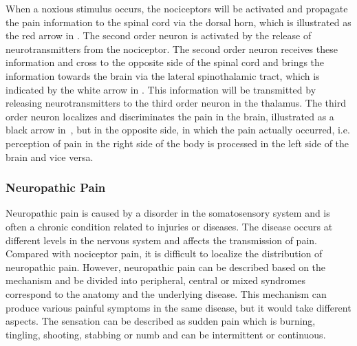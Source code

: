 When a noxious stimulus occurs, the nociceptors will be activated and propagate the pain information to the spinal cord via the dorsal horn, which is illustrated as the red arrow in . The second order neuron is activated by the release of neurotransmitters from the nociceptor. The second order neuron receives these information and cross  to the opposite side of the spinal cord and brings the information towards the brain via the lateral spinothalamic tract, which is indicated by the white arrow in . This information will be transmitted by releasing neurotransmitters to the third order neuron in the thalamus. The third order neuron localizes and discriminates the pain in the brain, illustrated as a black arrow in~, but in the opposite side, in which the pain actually occurred, i.e. perception of pain in the right side of the body is processed in the left side of the brain and vice versa. \cite{Martini2012} 

  



\subsubsection{Neuropathic Pain}
Neuropathic pain is caused by a disorder in the somatosensory system and is often a chronic condition related to injuries or diseases. The disease occurs at different levels in the nervous system and affects the transmission of pain. Compared with nociceptor pain, it is difficult to localize the distribution of neuropathic pain. However, neuropathic pain can be described based on the mechanism and be divided into peripheral, central or mixed syndromes correspond to the anatomy and the underlying disease. This mechanism can produce various painful symptoms in the same disease, but it would take different aspects. The sensation can be described as sudden pain which is burning, tingling, shooting, stabbing or numb and can be intermittent or continuous. \cite{Mindruta2013}


